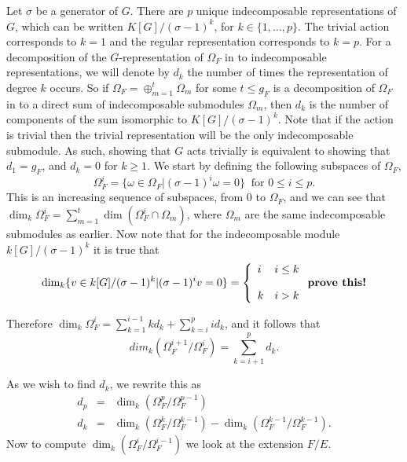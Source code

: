 Let $\sigma$ be a generator of $G$. 
There are $p$ unique indecomposable representations of $G$, which can be written $K[G]/(\sigma - 1)^k$, for $k\in \{1,\ldots, p\}$.
The trivial action corresponds to $k=1$ and the regular representation corresponds to $k=p$.
For a decomposition of the $G$-representation of $\Omega_F$ in to indecomposable representations, we will denote by $d_k$ the number of times the representation of degree $k$ occurs.
So if $\Omega_F = \oplus_{m=1}^t \Omega_m$ for some $t\leq g_F$ is a decomposition of $\Omega_F$ in to a direct sum of indecomposable submodules $\Omega_m$, then $d_k$ is the number of components of the sum isomorphic to $K[G]/(\sigma -1)^k.$
Note that if the action is trivial then the trivial representation will be the only indecomposable submodule. 
As such, showing that $G$ acts trivially is equivalent to showing that $d_1 = g_F$, and $d_k= 0 $ for $k \geq 1$.
We start by defining the following subspaces of $\Omega_F$,
\begin{equation*}
	\Omega_F^i = \{\omega\in \Omega_F | (\sigma - 1)^i\omega=0\}\ \mbox{ for } 0\leq i \leq p.
\end{equation*}
This is an increasing sequence of subspaces, from $0$ to $\Omega_F$, and we can see that $\dim_k\Omega_F^i = \sum_{m=1}^t\dim(\Omega_F^i \cap \Omega_m)$, where $\Omega_m$ are the same indecomposable submodules as earlier.
Now note that for the indecomposable module $k[G]/(\sigma - 1)^k$ it is true that 
\[
 \dim_k\{v \in k[G]/(\sigma - 1)^k | (\sigma - 1)^iv = 0\} = \left\{ \begin{array}{ll}
                                                                      i & i\leq k \\
\\
								      k & i > k
                                                                     \end{array} \right. \mbox{\textbf{prove this!}}
\]

Therefore $\dim_k\Omega_F^i = \sum _{k=1}^{i-1} kd_k + \sum_{k=i}^p id_k$, and it follows that 
\[
dim_k(\Omega_F^{i+1}/\Omega_F^i) = \sum_{k=i+1}^p d_k.
\]

As we wish to find $d_k$, we rewrite this as 
\begin{eqnarray*}
d_p & = & \dim_k(\Omega_F^p/\Omega_F^{p-1}) \\
d_k & = & \dim_k(\Omega_F^k/\Omega_F^{k-1}) - \dim_k(\Omega_F^{k-1}/\Omega_F^{k-1}).
\end{eqnarray*}
Now to compute $\dim_k(\Omega_F^i/\Omega_F^{i-1})$ we look at the extension $F/E$.


